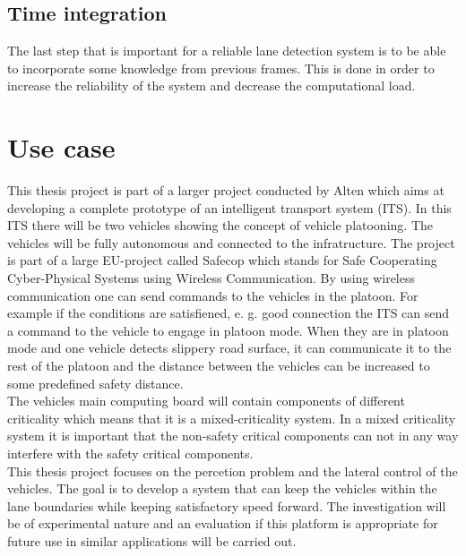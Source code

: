 \subsection{Time integration}
The last step that is important for a reliable lane detection system is to be able to incorporate some knowledge from previous frames. This is done in order to increase the reliability of the system and decrease the computational load.


\section{Use case}
This thesis project is part of a larger project conducted by Alten which aims at developing a complete prototype of an intelligent transport system (ITS). In this ITS there will be two vehicles showing the concept of vehicle platooning. The vehicles will be fully autonomous and connected to the infratructure. The project is part of a large EU-project called Safecop which stands for Safe Cooperating Cyber-Physical Systems using Wireless Communication. By using wireless communication one can send commands to the vehicles in the platoon. For example if the conditions are satisfiened, e. g. good connection the ITS can send a command to the vehicle to engage in platoon mode. When they are in platoon mode and one vehicle detects slippery road surface, it can communicate it to the rest of the platoon and the distance between the vehicles can be increased to some predefined safety distance.\\

The vehicles main computing board will contain components of different criticality which means that it is a mixed-criticality system. In a mixed criticality system it is important that the non-safety critical components can not in any way interfere with the safety critical components.\\


This thesis project focuses on the percetion problem and the lateral control of the vehicles. The goal is to develop a system that can keep the vehicles within the lane boundaries while keeping satisfactory speed forward. The investigation will be of experimental nature and an evaluation if this platform is appropriate for future use in similar applications will be carried out.




